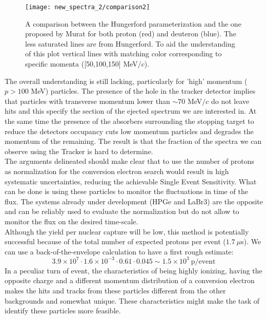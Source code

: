 \documentclass[12pt,a4paper,openright, oneside, titlepage]{book} %
\begin{document}
\begin{figure}[h!]
\centering
\texttt{[image: new\_spectra\_2/comparison2]}
\caption{A comparison \cite{io:comparison} between the Hungerford parameterization \cite{Hungerford} and the one proposed by Murat \cite{Pasha:spectra} for both proton (red) and deuteron (blue). The less saturated lines are from Hungerford. To aid the understanding of this plot vertical lines with matching color corresponding to specific momenta ([50,100,150] MeV$/c$).}
\label{_Comparison}
\end{figure}

\noindent The overall understanding is still lacking, particularly for 'high' momentum ($p>100$ MeV) particles.
The presence of the hole in the tracker detector implies that particles with transverse momentum lower than $\sim70$ MeV$/c$ do not leave hits and this specify the section of the ejected spectrum we are interested in. 
At the same time the presence of the absorbers surrounding the stopping target to reduce the detectors occupancy cuts low momentum particles and degrades the momentum of the remaining. 
The result is that the fraction of the spectra we can observe using the Tracker is hard to determine.\\ 

\noindent The arguments delineated should make clear that to use the number of protons as normalization for the conversion electron search would result in high systematic uncertainties, reducing the achievable Single Event Sensitivity. 
What can be done is using these particles to monitor the fluctuations in time of the flux. 
The systems already under development (HPGe and LaBr3) are the opposite and can be reliably used to evaluate the normalization but do not allow to monitor the flux on the desired time-scale.\\
Although the yield per nuclear capture will be low, this method is potentially successful because of the total number of expected protons per event ($1.7\ \mu$s). We can use a back-of-the-envelope calculation to have a first rough estimate:
$$3.9\times10^7 \cdot 1.6\times10^{-3} \cdot 0.61 \cdot 0.045 \sim 1.5\times10^3\ \text{p/event}$$
In a peculiar turn of event, the characteristics of being highly ionizing, having the opposite charge and a different momentum distribution of a conversion electron makes the hits and tracks from these particles different from the other backgrounds and somewhat unique. These characteristics might make the task of identify these particles more feasible.
\end{document}
